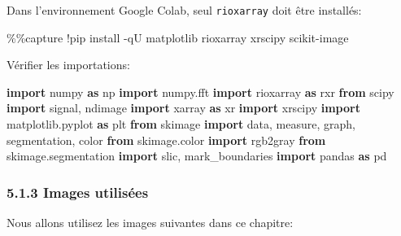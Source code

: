 \documentclass[
]{article}
\newenvironment{Shaded}{}{}
\newcommand{\ImportTok}[1]{\textcolor[rgb]{0.00,0.50,0.00}{\textbf{#1}}}
\newcommand{\NormalTok}[1]{#1}
\newcommand{\OperatorTok}[1]{\textcolor[rgb]{0.40,0.40,0.40}{#1}}
\begin{document}
Dans l'environnement Google Colab, seul \texttt{rioxarray} doit être
installés:

\label{67e4316c}
\label{cb1}
\begin{Shaded}
\begin{Highlighting}[]
\OperatorTok{\%\%}\NormalTok{capture}
\OperatorTok{!}\NormalTok{pip install }\OperatorTok{{-}}\NormalTok{qU matplotlib rioxarray xrscipy scikit}\OperatorTok{{-}}\NormalTok{image}
\end{Highlighting}
\end{Shaded}

Vérifier les importations:

\label{e19d140c}
\label{cb2}
\begin{Shaded}
\begin{Highlighting}[]
\ImportTok{import}\NormalTok{ numpy }\ImportTok{as}\NormalTok{ np}
\ImportTok{import}\NormalTok{ numpy.fft}
\ImportTok{import}\NormalTok{ rioxarray }\ImportTok{as}\NormalTok{ rxr}
\ImportTok{from}\NormalTok{ scipy }\ImportTok{import}\NormalTok{ signal, ndimage}
\ImportTok{import}\NormalTok{ xarray }\ImportTok{as}\NormalTok{ xr}
\ImportTok{import}\NormalTok{ xrscipy}
\ImportTok{import}\NormalTok{ matplotlib.pyplot }\ImportTok{as}\NormalTok{ plt}
\ImportTok{from}\NormalTok{ skimage }\ImportTok{import}\NormalTok{ data, measure, graph, segmentation, color}
\ImportTok{from}\NormalTok{ skimage.color }\ImportTok{import}\NormalTok{ rgb2gray}
\ImportTok{from}\NormalTok{ skimage.segmentation }\ImportTok{import}\NormalTok{ slic, mark\_boundaries}
\ImportTok{import}\NormalTok{ pandas }\ImportTok{as}\NormalTok{ pd}
\end{Highlighting}
\end{Shaded}

\subsubsection{\texorpdfstring{{5.1.3} Images
utilisées}{5.1.3 Images utilisées}}\label{images-utilisuxe9es}

Nous allons utilisez les images suivantes dans ce chapitre:
\end{document}
